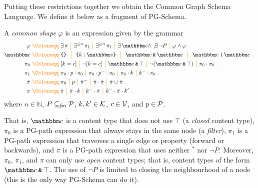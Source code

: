 Putting these restrictions together we obtain the Common Graph Schema Language. We define it below as a fragment of PG-Schema. 

\begin{definition}
\label{def:simple-shape}
    A \emph{common shape} $\varphi$ is an expression given by the grammar
\begin{align*}
\varphi  \gDef  & 
 \exists\,\pexpr
\gMid \exists^{\leq n} \, \pexpr_1
\gMid \exists^{\geq n} \, \pexpr_1 \gMid 
\exists\, \ntype \land \not\exists\, \lnot P
\gMid \varphi \land \varphi \gEnd\\
\ntype \gDef &\closedRT{}\  \gMid\  \closedRT{k : \vtype} \ \gMid\   \ntype \tAnd \ntype  \ \gMid \  \ntype \tOr \ntype  \gEnd\\
\pexpr_0 \gDef & \keyIsVal{k}{c} \gMid 
\lnot \keyIsVal{k}{c} \gMid \ntype\tAnd\top\gMid \lnot (\ntype\tAnd\top) \gMid \pexpr_0 \cdot \pexpr_0 \gEnd\\
\pexpr_1 \gDef &  \pexpr_0  \cdot p \cdot
\pexpr_0 
\gMid  \pexpr_0  \cdot p^{-} \cdot
\pexpr_0  \gMid \pexpr_0\cdot k \gMid k^{-}\cdot \pexpr_0 \gEnd\\
\ppexpr \gDef & \pexpr_0  \gMid p 
\gMid {\ppexpr}^{-} \gMid \ppexpr \cdot \ppexpr 
\gMid \ppexpr \cup \ppexpr \gEnd \\
\pexpr \gDef & \ppexpr \gMid \ppexpr \cdot k \gMid k^{-}\cdot \ppexpr \gMid k^{-}\cdot \ppexpr\cdot k' \gEnd
\end{align*}
where $n \in \mathbb{N}$, $P\subseteq_{\mathit{fin}} \mathcal{P}$, $k,k'\in\mathcal{K}$, $c\in\mathcal{V}$, and $p\in\mathcal{P}$. 
\end{definition}

That is, $\ntype$ is a content type that does not use $\top$ (a \emph{closed} content type),  $\pi_0$ is a PG-path expression that always stays in the same node (a \emph{filter}), $\pi_1$ is a PG-path expression that traverses a single edge or property (forward or backwards), and $\pi$ is a PG-path expression that uses neither ${}^{*}$ nor $\lnot P$. 
Moreover, $\pi_0$, $\pi_1$, and $\pi$ can only use \emph{open} content types; that is, content types of the form $\ntype \tAnd \top$.
The use of $\lnot P$ is limited to closing the neighbourhood of a node (this is the only way PG-Schema can do it). 




